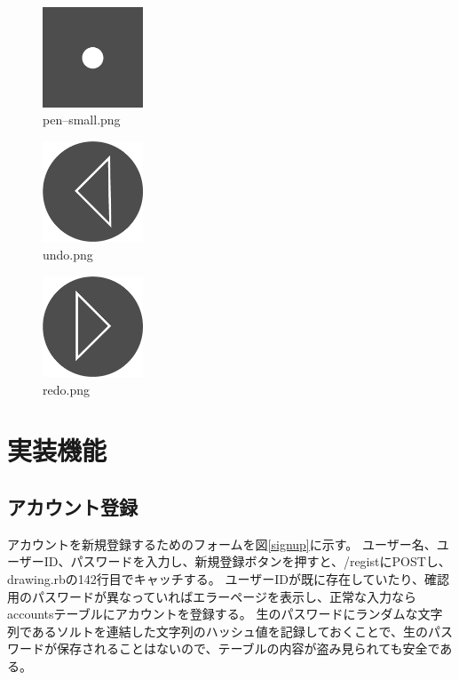 \documentclass[a4j,titlepage]{jsarticle}
\begin{document}
\begin{figure}[H]
  \centering
  \includegraphics[width=3cm]{../public/image/pen-small.png}
  \caption{pen--small.png}
  \label{fig:pensmall}
\end{figure}

\begin{figure}[H]
  \centering
  \includegraphics[width=3cm]{../public/image/undo.png}
  \caption{undo.png}
  \label{fig:undo}
\end{figure}

\begin{figure}[H]
  \centering
  \includegraphics[width=3cm]{../public/image/redo.png}
  \caption{redo.png}
  \label{fig:redo}
\end{figure}


\section{実装機能}
\subsection{アカウント登録}
アカウントを新規登録するためのフォームを図\ref{signup}に示す。
ユーザー名、ユーザーID、パスワードを入力し、新規登録ボタンを押すと、/registにPOSTし、drawing.rbの142行目でキャッチする。
ユーザーIDが既に存在していたり、確認用のパスワードが異なっていればエラーページを表示し、正常な入力ならaccountsテーブルにアカウントを登録する。
生のパスワードにランダムな文字列であるソルトを連結した文字列のハッシュ値を記録しておくことで、生のパスワードが保存されることはないので、テーブルの内容が盗み見られても安全である。
\end{document}
